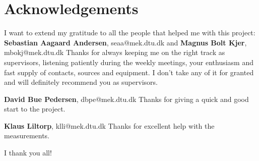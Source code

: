 \section*{Acknowledgements}
I want to extend my gratitude to all the people that helped me with this project: \newline \\
\textbf{Sebastian Aagaard Andersen}, seaa@mek.dtu.dk and\newline
\textbf{Magnus Bolt Kjer}, mbokj@mek.dtu.dk \newline
Thanks for always keeping me on the right track as supervisors, listening patiently during the weekly meetings, your enthusiasm and fast supply of contacts, sources and equipment. I don't take any of it for granted and will definitely recommend you as supervisors.

\textbf{David Bue Pedersen}, dbpe@mek.dtu.dk \newline
Thanks for giving a quick and good start to the project.

\textbf{Klaus Liltorp}, klli@mek.dtu.dk\newline
Thanks for excellent help with the measurements.

I thank you all!
